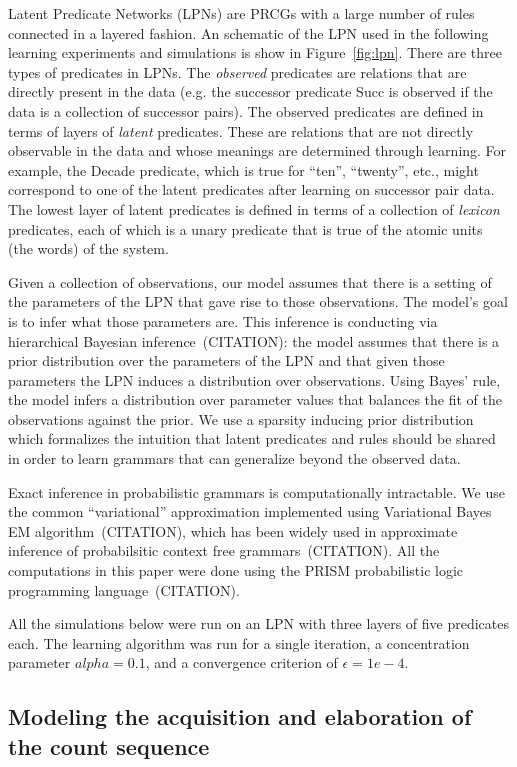 \documentclass[10pt,letterpaper]{article}
\begin{document}
Latent Predicate Networks (LPNs) are PRCGs with a large number of
rules connected in a layered fashion. An schematic of the LPN used in
the following learning experiments and simulations is show in
Figure~\ref{fig:lpn}. There are three types of predicates in LPNs. The
\emph{observed} predicates are relations that are directly present in
the data (e.g. the successor predicate Succ is observed if the data is
a collection of successor pairs). The observed predicates are defined
in terms of layers of \emph{latent} predicates. These are relations
that are not directly observable in the data and whose meanings are
determined through learning. For example, the Decade predicate, which
is true for ``ten'', ``twenty'', etc., might correspond to one of the
latent predicates after learning on successor pair data. The lowest
layer of latent predicates is defined in terms of a collection of
\emph{lexicon} predicates, each of which is a unary predicate that is
true of the atomic units (the words) of the system.

Given a collection of observations, our model assumes that there is a
setting of the parameters of the LPN that gave rise to those
observations. The model's goal is to infer what those parameters
are. This inference is conducting via hierarchical Bayesian
inference~(CITATION): the model assumes that there is a prior
distribution over the parameters of the LPN and that given those
parameters the LPN induces a distribution over observations. Using
Bayes' rule, the model infers a distribution over parameter values
that balances the fit of the observations against the prior. We use a
sparsity inducing prior distribution which formalizes the intuition
that latent predicates and rules should be shared in order to learn
grammars that can generalize beyond the observed data.

Exact inference in probabilistic grammars is computationally
intractable. We use the common ``variational'' approximation
implemented using Variational Bayes EM algorithm~(CITATION), which has
been widely used in approximate inference of probabilsitic context
free grammars~(CITATION). All the computations in this paper were done
using the PRISM probabilistic logic programming language~(CITATION).

All the simulations below were run on an LPN with three layers of five
predicates each. The learning algorithm was run for a single
iteration, a concentration parameter $alpha=0.1$, and a convergence
criterion of $\epsilon=1e-4$.

\subsection{Modeling the acquisition and elaboration of the count sequence}
\end{document}
